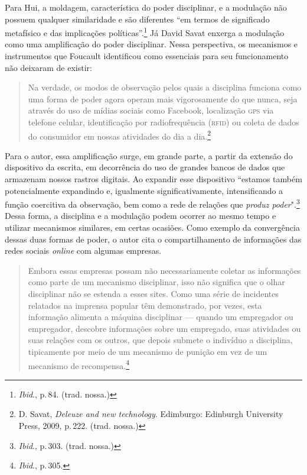 Para Hui, a moldagem, característica do poder disciplinar, e a modulação não
possuem qualquer similaridade e são diferentes ``em termos de
significado metafísico e das implicações políticas''.\footnote{\textit{Ibid}., p.\,84. (trad. nossa.)} Já David Savat enxerga a modulação como uma amplificação do poder disciplinar. Nessa perspectiva, os mecanismos e instrumentos que Foucault identificou como
essenciais para seu funcionamento não deixaram de existir:

\begin{quote}
Na verdade, os modos de observação pelos quais a disciplina funciona
como uma forma de poder agora operam mais vigorosamente do que nunca,
seja através do uso de mídias sociais como Facebook, localização \textsc{gps} via
telefone celular, identificação por radiofrequência (\textsc{rfid}) ou coleta de
dados do consumidor em nossas atividades do dia a dia.\footnote{D. Savat, \textit{Deleuze and new technology}. Edimburgo: Edinburgh University Press, 2009, p.\,222. (trad. nossa.)} 
\end{quote}

Para o autor, essa amplificação surge, em grande parte, a partir da
extensão do dispositivo da escrita, em decorrência do uso de grandes
bancos de dados que armazenam nossos rastros digitais. Ao expandir esse
dispositivo ``estamos também potencialmente expandindo e, igualmente
significativamente, intensificando a função coercitiva da observação,
bem como a rede de relações que \textit{produz poder}".\footnote{\textit{Ibid}., p.\,303. (trad. nossa.)}
Dessa forma, a disciplina e a modulação podem ocorrer ao mesmo tempo e
utilizar mecanismos similares, em certas ocasiões. Como exemplo da
convergência dessas duas formas de poder, o autor cita o
compartilhamento de informações das redes sociais \textit{online} com algumas
empresas.

\begin{quote}
Embora essas empresas possam não necessariamente coletar as informações
como parte de um mecanismo disciplinar, isso não significa que o olhar
disciplinar não se estenda a esses sites. Como uma série de incidentes
relatados na imprensa popular têm demonstrado, por vezes, esta
informação alimenta a máquina disciplinar --- quando um empregador ou
empregador, descobre informações sobre um empregado, suas atividades ou
suas relações com os outros, que depois submete o indivíduo a
disciplina, tipicamente por meio de um mecanismo de punição em vez de um
mecanismo de recompensa.\footnote{\textit{Ibid}., p.\,305.}
\end{quote}

